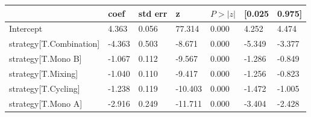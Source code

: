 \begin{tabular}{lllllll}
\toprule
 & coef & std err & z & $P>|z|$ & [0.025 & 0.975] \\
\midrule
Intercept & 4.363 & 0.056 &    77.314 &  0.000 & 4.252 & 4.474 \\
strategy[T.Combination] & -4.363 & 0.503 &    -8.671 &  0.000 & -5.349 & -3.377 \\
strategy[T.Mono B] & -1.067 & 0.112 &    -9.567 &  0.000 & -1.286 & -0.849 \\
strategy[T.Mixing] & -1.040 & 0.110 &    -9.417 &  0.000 & -1.256 & -0.823 \\
strategy[T.Cycling] & -1.238 & 0.119 &   -10.403 &  0.000 & -1.472 & -1.005 \\
strategy[T.Mono A] & -2.916 & 0.249 &   -11.711 &  0.000 & -3.404 & -2.428 \\
\bottomrule
\end{tabular}
